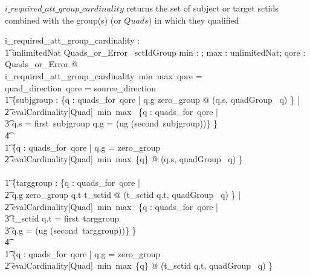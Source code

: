 \documentclass{article}
\begin{document}
\noindent
$i\_required\_att\_group\_cardinality$ returns the set of subject or target sctids combined with the group(s) (or $Quads$) in which they qualified
\begin{axdef}
   i\_required\_att\_group\_cardinality : \\
\t1 \nat \fun unlimitedNat \fun Quads\_or\_Error \ \fun \power sctIdGroup
\where
   \forall min : \nat; max : unlimitedNat; qore : Quads\_or\_Error  @ \\
i\_required\_att\_group\_cardinality~min~max~qore = \\
\IF quad\_direction~qore = source\_direction \THEN \\
\t1 \{subjgroup :  \{q : quads\_for~qore | q.g \neq zero\_group @ (q.s, quadGroup~ q) \} | \\
\t2 evalCardinality[Quad]~min~max~ \{q : quads\_for~qore | \\
\t3 q.s = first~subjgroup \land q.g = (ug \inv (second~subjgroup))\} \neq \emptyset \}  \\
\t4 \cup \\
\t1 \{q : quads\_for~qore | q.g = zero\_group \land  \\
\t2 evalCardinality[Quad]~min~max~\{q\} \neq \emptyset @ (q.s, quadGroup~ q) \} \\
\also
\ELSE \\
\t1 \{targgroup :  \{q : quads\_for~qore | \\
\t2 q.g \neq zero\_group \land q.t \in \ran t\_sctid @ (t\_sctid \inv q.t, quadGroup~ q) \} | \\
\t2 evalCardinality[Quad]~min~max~ \{q : quads\_for~qore | \\
\t3 t\_sctid \inv q.t = first~targgroup \land \\
\t3 q.g = (ug \inv (second~targgroup))\} \neq \emptyset \} \\
\t4 \cup \\
\t1 \{q : quads\_for~qore | q.g = zero\_group \land  \\
\t2 evalCardinality[Quad]~min~max~\{q\} \neq \emptyset @ (t\_sctid \inv q.t, quadGroup~ q) \} \\
\end{axdef}
\end{document}

